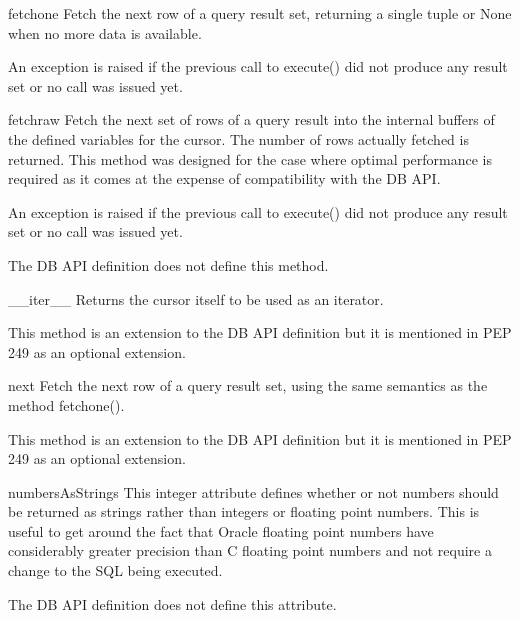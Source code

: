 \documentclass{manual}
\begin{document}
\begin{funcdesc}{fetchone}{}
  Fetch the next row of a query result set, returning a single tuple or None
  when no more data is available.

  An exception is raised if the previous call to execute() did not produce any
  result set or no call was issued yet.
\end{funcdesc}

\begin{funcdesc}{fetchraw}{}
  Fetch the next set of rows of a query result into the internal buffers of the
  defined variables for the cursor. The number of rows actually fetched is
  returned.  This method was designed for the case where optimal performance is
  required as it comes at the expense of compatibility with the DB API.

  An exception is raised if the previous call to execute() did not produce any
  result set or no call was issued yet.

   The DB API definition does not define this method.
\end{funcdesc}

\begin{funcdesc}{__iter__}{}
  Returns the cursor itself to be used as an iterator.

   This method is an extension to the DB API definition but it
  is mentioned in PEP 249 as an optional extension.
\end{funcdesc}

\begin{funcdesc}{next}{}
  Fetch the next row of a query result set, using the same semantics as
  the method fetchone().

   This method is an extension to the DB API definition but it
  is mentioned in PEP 249 as an optional extension.
\end{funcdesc}

\begin{datadesc}{numbersAsStrings}
  This integer attribute defines whether or not numbers should be returned as
  strings rather than integers or floating point numbers. This is useful to get
  around the fact that Oracle floating point numbers have considerably greater
  precision than C floating point numbers and not require a change to the SQL
  being executed.

   The DB API definition does not define this attribute.
\end{datadesc}
\end{document}
